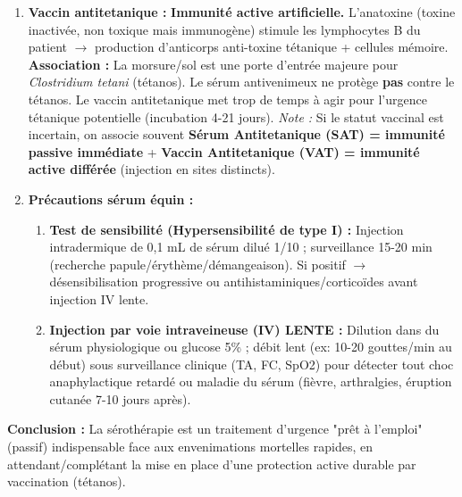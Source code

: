 \documentclass[11pt]{article}
\begin{document}
\begin{exoresolu}
\begin{enumerate}
 \item \textbf{Vaccin antitetanique :} \textbf{Immunité active artificielle.} L'anatoxine (toxine inactivée, non toxique mais immunogène) stimule les lymphocytes B du patient $\rightarrow$ production d'anticorps anti-toxine tétanique + cellules mémoire.
 \textbf{Association :} La morsure/sol est une porte d'entrée majeure pour \emph{Clostridium tetani} (tétanos). Le sérum antivenimeux ne protège \textbf{pas} contre le tétanos. Le vaccin antitetanique met trop de temps à agir pour l'urgence tétanique potentielle (incubation 4-21 jours). \textit{Note :} Si le statut vaccinal est incertain, on associe souvent \textbf{Sérum Antitetanique (SAT) = immunité passive immédiate} + \textbf{Vaccin Antitetanique (VAT) = immunité active différée} (injection en sites distincts).
 \item \textbf{Précautions sérum équin :}
 \begin{enumerate}
 \item \textbf{Test de sensibilité (Hypersensibilité de type I) :} Injection intradermique de 0,1 mL de sérum dilué 1/10 ; surveillance 15-20 min (recherche papule/érythème/démangeaison). Si positif $\rightarrow$ désensibilisation progressive ou antihistaminiques/corticoïdes avant injection IV lente.
 \item \textbf{Injection par voie intraveineuse (IV) LENTE :} Dilution dans du sérum physiologique ou glucose 5\% ; débit lent (ex: 10-20 gouttes/min au début) sous surveillance clinique (TA, FC, SpO2) pour détecter tout choc anaphylactique retardé ou maladie du sérum (fièvre, arthralgies, éruption cutanée 7-10 jours après).
 \end{enumerate}
\end{enumerate}
\textbf{Conclusion :} La sérothérapie est un traitement d'urgence "prêt à l'emploi" (passif) indispensable face aux envenimations mortelles rapides, en attendant/complétant la mise en place d'une protection active durable par vaccination (tétanos).
\end{exoresolu}
\end{document}
